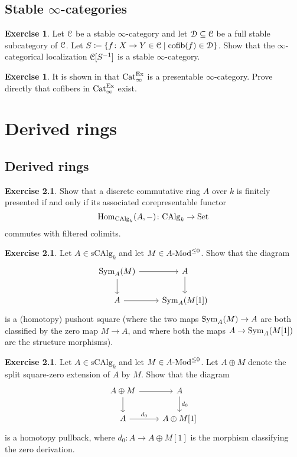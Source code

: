 \documentclass[10pt,a4paper,reqno,oneside]{book} %
\theoremstyle{plain}
\theoremstyle{definition}
\newtheorem{exercise}[thm]{Exercise}
\theoremstyle{remark}
\numberwithin{equation}{section}
\begin{document}
\section{Stable $\infty$-categories}

\begin{exercise}
	Let $\mathcal C$ be a stable $\infty$-category and let $\mathcal D \subseteq \mathcal C$ be a full stable subcategory of $\mathcal C$.
	Let $S \coloneqq \{f \colon X \to Y \in \mathcal C \mid \mathrm{cofib}(f) \in \mathcal D\}$.
	Show that the $\infty$-categorical localization $\mathcal C[S^{-1}]$ is a stable $\infty$-category.
\end{exercise}

\begin{exercise}
	It is shown in \cite{Blumberg_Gepner_Universal_2013} that $\mathrm{Cat}_\infty^{\mathrm{Ex}}$ is a presentable $\infty$-category.
	Prove directly that cofibers in $\mathrm{Cat}_\infty^{\mathrm{Ex}}$ exist.
\end{exercise}

\chapter{Derived rings}

\section{Derived rings}

\begin{exercise}
	Show that a discrete commutative ring $A$ over $k$ is finitely presented if and only if its associated corepresentable functor
	\[ \operatorname{Hom}_{\mathrm{CAlg}_k}(A,-) \colon \mathrm{CAlg}_k \to \mathrm{Set} \]
	commutes with filtered colimits.
\end{exercise}

\begin{exercise}
	Let $A \in \mathrm{sCAlg}_k$ and let $M \in A\textrm{-}\mathrm{Mod}^{\le 0}$.
	Show that the diagram
	\[ \begin{tikzcd}
		\Sym_A(M) \arrow{r} \arrow{d} & A \arrow{d} \\
		A \arrow{r} & \Sym_A(M[1])
	\end{tikzcd} \]
	is a (homotopy) pushout square (where the two maps $\operatorname{Sym}_A(M) \to A$ are both classified by the zero map $M \to A$, and where both the maps $A \to \operatorname{Sym}_A(M[1])$ are the structure morphisms).
\end{exercise}

\begin{exercise}
	Let $A \in \mathrm{sCAlg}_k$ and let $M \in A \textrm{-}\mathrm{Mod}^{\le 0}$.
	Let $A \oplus M$ denote the split square-zero extension of $A$ by $M$.
	Show that the diagram
	\[ \begin{tikzcd}
		A \oplus M \arrow{r} \arrow{d} & A \arrow{d}{d_0} \\
		A \arrow{r}{d_0} & A \oplus M[1]
	\end{tikzcd} \]
	is a homotopy pullback, where $d_0 \colon A \to A \oplus M[1]$ is the morphism classifying the zero derivation.
\end{exercise}
\end{document}
